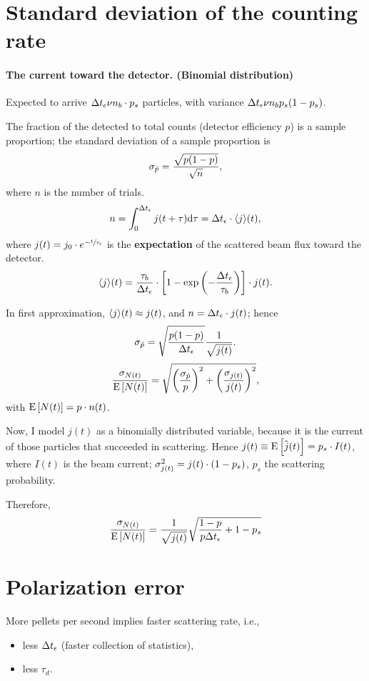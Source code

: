 \documentclass{article}
\newcommand{\dt}{\Delta t}
\newcommand{\dtm}{\dt_{\meas}}
\newcommand{\LTb}{\tau_b}
\newcommand{\pdet}{p}
\newcommand{\pscat}{p_s}
\begin{document}
\section{Standard deviation of the counting rate}
\paragraph{The current toward the detector. (Binomial distribution)}
Expected to arrive $\dtm\nu n_b\cdot\pscat$ particles, with variance $\dtm\nu n_b\pscat(1-\pscat)$.

The fraction of the detected to total counts (detector efficiency $\pdet$) is a sample proportion; the standard deviation of a sample proportion is
\[
\SD{\hat{\pdet}} = \frac{\sqrt{\pdet(1-\pdet)}}{\sqrt{n}}, 
\]
where $n$ is the number of trials.
\[
n = \int_{0}^{\dtm} j(t+\tau)\td\tau = \dtm\cdot\avg{j}(t),
\]
where $j(t) = j_0\cdot e^{-\sfrac{t}{\LTb}}$ is the \textbf{expectation} of the scattered beam flux toward the detector. 
\[
\avg{j}(t) = \frac{\LTb}{\dtm}\cdot\bkt*{1-\exp\bkt{-\frac{\dtm}{\LTb}}}\cdot j(t).
\]

In first approximation, $\langle j\rangle(t) \approx j(t)$, and $n = \dtm\cdot j(t)$; hence
\[
\SD{\hat{\pdet}} = \sqrt{\frac{\pdet(1-\pdet)}{\dtm}}\frac{1}{\sqrt{j(t)}}.
\]
\begin{align*}
	\frac{\SD{N(t)}}{\Xpct{N(t)}} = \sqrt{\bkt{\frac{\SD{\hat{\pdet}}}{\pdet}}^2 + \bkt{\frac{\SD{j(t)}}{j(t)}}^2},
\end{align*}
with $\Xpct{N(t)} = \pdet\cdot n(t)$.

Now, I model $j(t)$ as a binomially distributed variable, because it is the current of those particles that succeeded in scattering. Hence $j(t) \equiv \Xpct{\hat{j}(t)} = \pscat\cdot I(t)$, where $I(t)$ is the beam current; $\SD{j(t)}^2 = j(t)\cdot (1-\pscat)$, $\pscat$ the scattering probability.

Therefore,
\[
\frac{\SD{N(t)}}{\Xpct{N(t)}} = \frac{1}{\sqrt{j(t)}}\sqrt{\frac{1-\pdet}{\pdet\dtm} + 1-\pscat}
\]

\section{Polarization error}
More pellets per second implies faster scattering rate, i.e.,
\begin{itemize}
	\item less $\dt_{\meas}$ (faster collection of statistics),
	\item less $\tau_d$.
\end{itemize}
\end{document}

